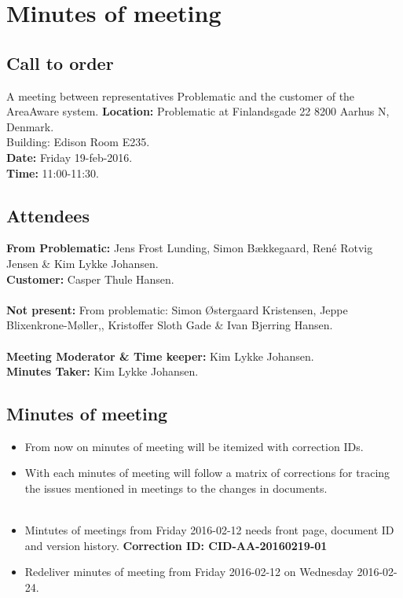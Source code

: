 %
\thispagestyle{fancy}
\chapter*{Minutes of meeting}


\section*{Call to order}
A meeting between representatives Problematic and the customer of the AreaAware system.
\textbf{Location:} Problematic at Finlandsgade 22 8200 Aarhus N, Denmark.\\ Building: Edison Room E235.\\
\textbf{Date:} Friday 19-feb-2016. \\
\textbf{Time:} 11:00-11:30.
\section*{Attendees}
\textbf{From Problematic:} Jens Frost Lunding, Simon Bækkegaard, René Rotvig Jensen \& Kim Lykke Johansen.\\
\textbf{Customer:} Casper Thule Hansen.\\\\
\textbf{Not present:} From problematic: Simon Østergaard Kristensen, Jeppe Blixenkrone-Møller,, Kristoffer Sloth Gade \& Ivan Bjerring Hansen.\\\\
\textbf{Meeting Moderator \& Time keeper:} Kim Lykke Johansen. \\
\textbf{Minutes Taker:} Kim Lykke Johansen.

\section*{Minutes of meeting}
\begin{itemize}
    \item From now on minutes of meeting will be itemized with correction IDs.
    \item With each minutes of meeting will follow a matrix of corrections for tracing the issues mentioned in meetings to the changes in documents.\\\\
    \item Mintutes of meetings from Friday 2016-02-12 needs front page, document ID and version history. \textbf{Correction ID: CID-AA-20160219-01}
    \item Redeliver minutes of meeting from Friday 2016-02-12 on Wednesday 2016-02-24.
\end{itemize}

